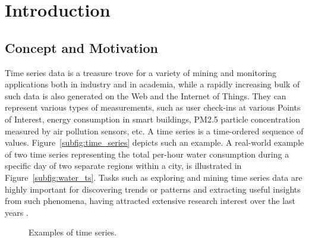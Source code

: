 
\chapter{Introduction} \label{chap:intro}

\section{Concept and Motivation}
\label{subsec:conept_motivation}

Time series data is a treasure trove for a variety of mining and monitoring applications both in industry and in academia, while a rapidly increasing bulk of such data is also generated on the Web and the Internet of Things. They can represent various types of measurements, such as user check-ins at various Points of Interest, energy consumption in smart buildings, PM2.5 particle concentration measured by air pollution sensors, etc. A time series is a time-ordered sequence of values. Figure~\ref{subfig:time_series} depicts such an example. A real-world example of two time series representing the total per-hour water consumption during a specific day of two separate regions within a city, is illustrated in Figure~\ref{subfig:water_ts}. Tasks such as exploring and mining time series data are highly important for discovering trends or patterns and extracting useful insights from such phenomena, having attracted extensive research interest over the last years \cite{DBLP:journals/pvldb/EchihabiZPB18,DBLP:conf/sigmod/LinardiZPK18a,DBLP:journals/datamine/YehZUBDDZSMK18,camerra2014kais,ding2008pvldb,shieh2008kdd}.

\begin{figure}[!ht]
 \centering
\caption{Examples of time series.}
\label{fig:ts_examples}
\end{figure}

